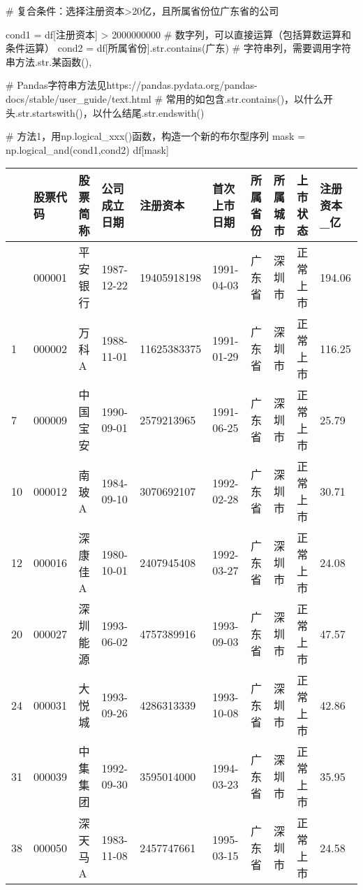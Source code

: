 \documentclass[
  letterpaper,
  DIV=11,
  numbers=noendperiod]{scrreprt}
\newenvironment{Shaded}{\begin{snugshade}}{\end{snugshade}}
\newcommand{\BuiltInTok}[1]{\textcolor[rgb]{0.00,0.23,0.31}{#1}}
\newcommand{\CommentTok}[1]{\textcolor[rgb]{0.37,0.37,0.37}{#1}}
\newcommand{\DecValTok}[1]{\textcolor[rgb]{0.68,0.00,0.00}{#1}}
\newcommand{\NormalTok}[1]{\textcolor[rgb]{0.00,0.23,0.31}{#1}}
\newcommand{\OperatorTok}[1]{\textcolor[rgb]{0.37,0.37,0.37}{#1}}
\newcommand{\StringTok}[1]{\textcolor[rgb]{0.13,0.47,0.30}{#1}}
\begin{document}
\begin{Shaded}
\begin{Highlighting}[]
\CommentTok{\# 复合条件：选择注册资本\textgreater{}20亿，且所属省份位广东省的公司}

\NormalTok{cond1 }\OperatorTok{=}\NormalTok{ df[}\StringTok{\textquotesingle{}注册资本\textquotesingle{}}\NormalTok{] }\OperatorTok{\textgreater{}} \DecValTok{2000000000} \CommentTok{\# 数字列，可以直接运算（包括算数运算和条件运算）}
\NormalTok{cond2 }\OperatorTok{=}\NormalTok{ df[}\StringTok{\textquotesingle{}所属省份\textquotesingle{}}\NormalTok{].}\BuiltInTok{str}\NormalTok{.contains(}\StringTok{\textquotesingle{}广东\textquotesingle{}}\NormalTok{) }\CommentTok{\# 字符串列，需要调用字符串方法\textasciigrave{}.str.某函数()\textasciigrave{},}

\CommentTok{\# Pandas字符串方法见https://pandas.pydata.org/pandas{-}docs/stable/user\_guide/text.html}
\CommentTok{\# 常用的如包含.str.contains()，以什么开头.str.startswith()，以什么结尾.str.endswith()}

\CommentTok{\# 方法1，用np.logical\_xxx()函数，构造一个新的布尔型序列}
\NormalTok{mask }\OperatorTok{=}\NormalTok{ np.logical\_and(cond1,cond2)}
\NormalTok{df[mask]}
\end{Highlighting}
\end{Shaded}

\begin{longtable}[]{@{}llllllllll@{}}
\toprule\noalign{}
& 股票代码 & 股票简称 & 公司成立日期 & 注册资本 & 首次上市日期 &
所属省份 & 所属城市 & 上市状态 & 注册资本\_亿 \\
\midrule\noalign{}
\endhead
\bottomrule\noalign{}
\endlastfoot
0 & 000001 & 平安银行 & 1987-12-22 & 19405918198 & 1991-04-03 & 广东省 &
深圳市 & 正常上市 & 194.06 \\
1 & 000002 & 万科A & 1988-11-01 & 11625383375 & 1991-01-29 & 广东省 &
深圳市 & 正常上市 & 116.25 \\
7 & 000009 & 中国宝安 & 1990-09-01 & 2579213965 & 1991-06-25 & 广东省 &
深圳市 & 正常上市 & 25.79 \\
10 & 000012 & 南玻A & 1984-09-10 & 3070692107 & 1992-02-28 & 广东省 &
深圳市 & 正常上市 & 30.71 \\
12 & 000016 & 深康佳A & 1980-10-01 & 2407945408 & 1992-03-27 & 广东省 &
深圳市 & 正常上市 & 24.08 \\
20 & 000027 & 深圳能源 & 1993-06-02 & 4757389916 & 1993-09-03 & 广东省 &
深圳市 & 正常上市 & 47.57 \\
24 & 000031 & 大悦城 & 1993-09-26 & 4286313339 & 1993-10-08 & 广东省 &
深圳市 & 正常上市 & 42.86 \\
31 & 000039 & 中集集团 & 1992-09-30 & 3595014000 & 1994-03-23 & 广东省 &
深圳市 & 正常上市 & 35.95 \\
38 & 000050 & 深天马A & 1983-11-08 & 2457747661 & 1995-03-15 & 广东省 &
深圳市 & 正常上市 & 24.58 \\
\end{longtable}
\end{document}
